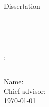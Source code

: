 \documentclass[11pt, oneside]{Thesis} %
\begin{document}
\begin{titlepage}
\begin{center}
\LARGE
{Dissertation}\\[0.5cm] %

\vspace{3cm}

{\bfseries \ttitle \\
	\begin{CJK}{UTF8}{min}
		\Large
		\jtitle
	\end{CJK}
}\\[1cm] %


\vspace{3cm}

\begin{minipage}{.5\textwidth}
	\begin{flushleft}
		\groupname, \univname
	\end{flushleft}
\end{minipage}
\begin{minipage}{.48\textwidth}
	\begin{flushright}
	\end{flushright}
\end{minipage}

\vspace{1.5cm}

\begin{minipage}{.48\textwidth}
	\begin{flushleft}
	\end{flushleft}
\end{minipage}
\begin{minipage}{.5\textwidth}
	\begin{flushright}
		\deptname %
	\end{flushright}
\end{minipage}

\vspace{1.5cm}

\begin{flushleft} \Large
	{\sid}\\ %
	{Name: \authornames} \\ %
	{Chief advisor: \chiefname}\\ %
	{\today} %
\end{flushleft}


\end{center}
\end{titlepage}
\end{document}
